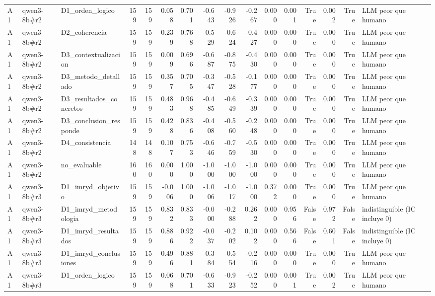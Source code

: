 \begin{table}
{\begin{tabular}{lllrrrrrrrrrrrrl}
A1 & qwen3-8b\#r2 & D1\_orden\_logico & 159 & 159 & 0.058 & 0.701 & -0.643 & -0.926 & -0.267 & 0.000 & 0.001 & True & 0.002 & True & LLM peor que humano \\
A1 & qwen3-8b\#r2 & D2\_coherencia & 159 & 159 & 0.239 & 0.768 & -0.529 & -0.624 & -0.427 & 0.000 & 0.000 & True & 0.000 & True & LLM peor que humano \\
A1 & qwen3-8b\#r2 & D3\_contextualizacion & 159 & 159 & 0.009 & 0.696 & -0.687 & -0.875 & -0.430 & 0.000 & 0.000 & True & 0.000 & True & LLM peor que humano \\
A1 & qwen3-8b\#r2 & D3\_metodo\_detallado & 159 & 159 & 0.357 & 0.705 & -0.347 & -0.528 & -0.177 & 0.000 & 0.000 & True & 0.000 & True & LLM peor que humano \\
A1 & qwen3-8b\#r2 & D3\_resultados\_concretos & 159 & 159 & 0.483 & 0.968 & -0.485 & -0.649 & -0.339 & 0.000 & 0.000 & True & 0.000 & True & LLM peor que humano \\
A1 & qwen3-8b\#r2 & D3\_conclusion\_responde & 159 & 159 & 0.428 & 0.836 & -0.408 & -0.560 & -0.248 & 0.000 & 0.000 & True & 0.000 & True & LLM peor que humano \\
A1 & qwen3-8b\#r2 & D4\_consistencia & 148 & 148 & 0.107 & 0.753 & -0.646 & -0.759 & -0.530 & 0.000 & 0.000 & True & 0.000 & True & LLM peor que humano \\
A1 & qwen3-8b\#r2 & no\_evaluable & 160 & 160 & 0.000 & 1.000 & -1.000 & -1.000 & -1.000 & 0.000 & 0.000 & True & 0.000 & True & LLM peor que humano \\
A1 & qwen3-8b\#r3 & D1\_imryd\_objetivo & 159 & 159 & -0.006 & 1.000 & -1.006 & -1.017 & -1.000 & 0.372 & 0.000 & True & 0.000 & True & LLM peor que humano \\
A1 & qwen3-8b\#r3 & D1\_imryd\_metodologia & 159 & 159 & 0.832 & 0.833 & -0.000 & -0.288 & 0.262 & 0.000 & 0.956 & False & 0.972 & False & indistinguible (IC incluye 0) \\
A1 & qwen3-8b\#r3 & D1\_imryd\_resultados & 159 & 159 & 0.886 & 0.922 & -0.037 & -0.202 & 0.102 & 0.000 & 0.566 & False & 0.601 & False & indistinguible (IC incluye 0) \\
A1 & qwen3-8b\#r3 & D1\_imryd\_conclusiones & 159 & 159 & 0.496 & 0.881 & -0.384 & -0.554 & -0.216 & 0.000 & 0.000 & True & 0.000 & True & LLM peor que humano \\
A1 & qwen3-8b\#r3 & D1\_orden\_logico & 159 & 159 & 0.068 & 0.701 & -0.633 & -0.923 & -0.252 & 0.000 & 0.001 & True & 0.002 & True & LLM peor que humano \\

\end{tabular}}
\end{table}
